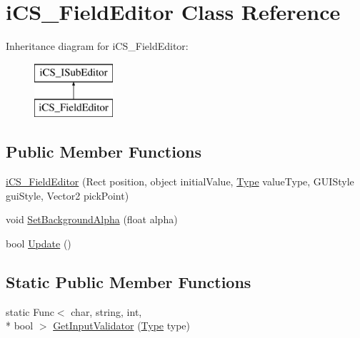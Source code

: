 \hypertarget{classi_c_s___field_editor}{\section{i\+C\+S\+\_\+\+Field\+Editor Class Reference}
\label{classi_c_s___field_editor}
}
Inheritance diagram for i\+C\+S\+\_\+\+Field\+Editor\+:\begin{figure}[H]
\begin{center}
\leavevmode
\includegraphics[height=2.000000cm]{classi_c_s___field_editor}
\end{center}
\end{figure}
\subsection*{Public Member Functions}
\begin{DoxyCompactItemize}
\item 
\hyperlink{classi_c_s___field_editor_a5000e613c5e78e892cf88ffd69241a3f}{i\+C\+S\+\_\+\+Field\+Editor} (Rect position, object initial\+Value, \hyperlink{i_c_s___object_type_enum_8cs_ae6c3dd6d8597380b56d94908eb431547aa1fa27779242b4902f7ae3bdd5c6d508}{Type} value\+Type, G\+U\+I\+Style gui\+Style, Vector2 pick\+Point)
\item 
void \hyperlink{classi_c_s___field_editor_a161374a2755ae5eb4610c14571647d36}{Set\+Background\+Alpha} (float alpha)
\item 
bool \hyperlink{classi_c_s___field_editor_a1d55490c95942bd38ed2b2ba1abcea78}{Update} ()
\end{DoxyCompactItemize}
\subsection*{Static Public Member Functions}
\begin{DoxyCompactItemize}
\item 
static Func$<$ char, string, int, \\*
bool $>$ \hyperlink{classi_c_s___field_editor_a58d7ac96ece7a1566b9ad05fd7210df3}{Get\+Input\+Validator} (\hyperlink{i_c_s___object_type_enum_8cs_ae6c3dd6d8597380b56d94908eb431547aa1fa27779242b4902f7ae3bdd5c6d508}{Type} type)
\end{DoxyCompactItemize}
